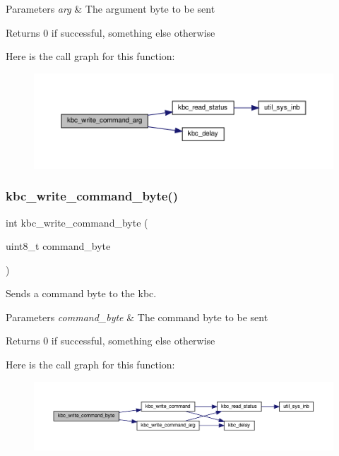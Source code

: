 \begin{DoxyParams}{Parameters}
{\em arg} & The argument byte to be sent \\
\hline
\end{DoxyParams}
\begin{DoxyReturn}{Returns}
0 if successful, something else otherwise 
\end{DoxyReturn}
Here is the call graph for this function\+:\nopagebreak
\begin{figure}[H]
\begin{center}
\leavevmode
\includegraphics[width=350pt]{group__kbc_ga24f1a4d1bcb60a73ebd6cee462191a52_cgraph}
\end{center}
\end{figure}
\mbox{\label{group__kbc_ga5e840dccbbe5abccff8ca66f78c476c9}} 
\subsubsection{\texorpdfstring{kbc\+\_\+write\+\_\+command\+\_\+byte()}{kbc\_write\_command\_byte()}}
{\footnotesize\ttfamily int kbc\+\_\+write\+\_\+command\+\_\+byte (\begin{DoxyParamCaption}\item[{uint8\+\_\+t}]{command\+\_\+byte }\end{DoxyParamCaption})}



Sends a command byte to the kbc. 


\begin{DoxyParams}{Parameters}
{\em command\+\_\+byte} & The command byte to be sent \\
\hline
\end{DoxyParams}
\begin{DoxyReturn}{Returns}
0 if successful, something else otherwise 
\end{DoxyReturn}
Here is the call graph for this function\+:\nopagebreak
\begin{figure}[H]
\begin{center}
\leavevmode
\includegraphics[width=350pt]{group__kbc_ga5e840dccbbe5abccff8ca66f78c476c9_cgraph}
\end{center}
\end{figure}
